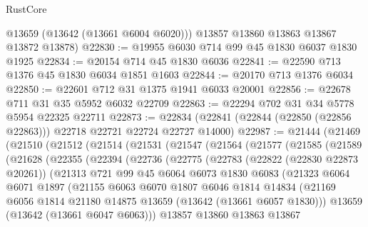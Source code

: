 \begin{lexlean}{RustCore}
\begin{coremodule}
        @13659
        (@13642 (@13661 @6004 @6020)))
      @13857
      @13860
      @13863
      @13867
      @13872
      @13878)
@22830 := @19955 @6030 @714 @99 @45 @1830 @6037 @1830 @1925
@22834 := @20154 @714 @45 @1830 @6036
@22841 := @22590 @713 @1376 @45 @1830 @6034 @1851 @1603
@22844 := @20170 @713 @1376 @6034
@22850 := @22601 @712 @31 @1375 @1941 @6033 @20001
@22856 := @22678 @711 @31 @35 @5952 @6032 @22709
@22863 := @22294 @702 @31 @34 @5778 @5954 @22325 @22711
@22873 := @22834 (@22841 (@22844 (@22850 (@22856 @22863))) @22718 @22721 @22724 @22727 @14000)
@22987 := @21444
    (@21469
      (@21510
        (@21512
          (@21514
            (@21531
              (@21547
                (@21564
                  (@21577
                    (@21585
                      (@21589
                        (@21628
                          (@22355
                            (@22394
                              (@22736
                                (@22775
                                  (@22783
                                    (@22822 (@22830 @22873 @20261))
                                    (@21313
                                      @721
                                      @99
                                      @45
                                      @6064
                                      @6073
                                      @1830
                                      @6083
                                      (@21323
                                        @6064
                                        @6071
                                        @1897
                                        (@21155
                                          @6063
                                          @6070
                                          @1807
                                          @6046
                                          @1814
                                          @14834
                                          (@21169
                                            @6056
                                            @1814
                                            @21180
                                            @14875
                                            @13659
                                            (@13642 (@13661 @6057 @1830)))
                                          @13659
                                          (@13642 (@13661 @6047 @6063)))
                                        @13857
                                        @13860
                                        @13863
                                        @13867

\end{coremodule}
\end{lexlean}
